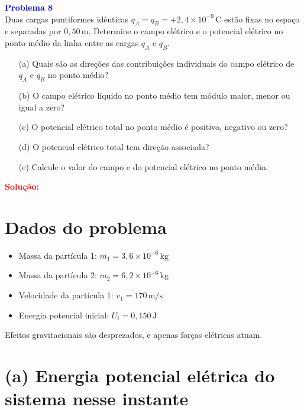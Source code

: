 \documentclass[a4paper,12pt]{article}
\begin{document}
\begin{flushleft}
\textbf{\textcolor{blue}{\Large Problema 8}}\\

Duas cargas puntiformes idênticas \( q_A = q_B = +2{,}4 \times 10^{-9} \, \text{C} \) estão 
fixas no espaço e separadas por \( 0{,}50 \, \text{m} \). Determine o campo elétrico e o potencial 
elétrico no ponto médio da linha entre as cargas \( q_A \) e \( q_B \).

\begin{enumerate}
    \item[(a)] Quais são as direções das contribuições individuais do campo elétrico de \( q_A \) e \( q_B \) no ponto médio?
    \item[(b)] O campo elétrico líquido no ponto médio tem módulo maior, menor ou igual a zero?
    \item[(c)] O potencial elétrico total no ponto médio é positivo, negativo ou zero?
    \item[(d)] O potencial elétrico total tem direção associada?
    \item[(e)] Calcule o valor do campo e do potencial elétrico no ponto médio.
\end{enumerate}

\textcolor{red}{\textbf{Solução:}}\\

\section*{Dados do problema}

\begin{itemize}
    \item Massa da partícula 1: \( m_1 = 3{,}6 \times 10^{-6} \, \text{kg} \)
    \item Massa da partícula 2: \( m_2 = 6{,}2 \times 10^{-6} \, \text{kg} \)
    \item Velocidade da partícula 1: \( v_1 = 170 \, \text{m/s} \)
    \item Energia potencial inicial: \( U_i = 0{,}150 \, \text{J} \)
\end{itemize}

Efeitos gravitacionais são desprezados, e apenas forças elétricas atuam.

\section*{(a) Energia potencial elétrica do sistema nesse instante}


\end{flushleft}
\end{document}
